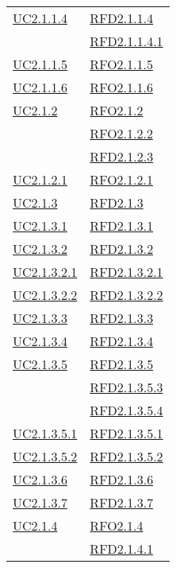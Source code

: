 \begin{longtable}{|>{\centering}m{5cm}|m{5cm}<{\centering}|}
\hyperref[UC2.1.1.4]{UC2.1.1.4} & \hyperlink{RFD2.1.1.4}{RFD2.1.1.4}\\
& \hyperlink{RFD2.1.1.4.1}{RFD2.1.1.4.1}\\ \hline
\hyperref[UC2.1.1.5]{UC2.1.1.5} & \hyperlink{RFO2.1.1.5}{RFO2.1.1.5}\\ \hline
\hyperref[UC2.1.1.6]{UC2.1.1.6} & \hyperlink{RFO2.1.1.6}{RFO2.1.1.6}\\ \hline
\hyperref[UC2.1.2]{UC2.1.2} & \hyperlink{RFO2.1.2}{RFO2.1.2}\\
& \hyperlink{RFO2.1.2.2}{RFO2.1.2.2}\\
& \hyperlink{RFD2.1.2.3}{RFD2.1.2.3}\\ \hline
\hyperref[UC2.1.2.1]{UC2.1.2.1} & \hyperlink{RFO2.1.2.1}{RFO2.1.2.1}\\ \hline
\hyperref[UC2.1.3]{UC2.1.3} & \hyperlink{RFD2.1.3}{RFD2.1.3}\\ \hline
\hyperref[UC2.1.3.1]{UC2.1.3.1} & \hyperlink{RFD2.1.3.1}{RFD2.1.3.1}\\ \hline
\hyperref[UC2.1.3.2]{UC2.1.3.2} & \hyperlink{RFD2.1.3.2}{RFD2.1.3.2}\\ \hline
\hyperref[UC2.1.3.2.1]{UC2.1.3.2.1} & \hyperlink{RFD2.1.3.2.1}{RFD2.1.3.2.1}\\ \hline
\hyperref[UC2.1.3.2.2]{UC2.1.3.2.2} & \hyperlink{RFD2.1.3.2.2}{RFD2.1.3.2.2}\\ \hline
\hyperref[UC2.1.3.3]{UC2.1.3.3} & \hyperlink{RFD2.1.3.3}{RFD2.1.3.3}\\ \hline
\hyperref[UC2.1.3.4]{UC2.1.3.4} & \hyperlink{RFD2.1.3.4}{RFD2.1.3.4}\\ \hline
\hyperref[UC2.1.3.5]{UC2.1.3.5} & \hyperlink{RFD2.1.3.5}{RFD2.1.3.5}\\
& \hyperlink{RFD2.1.3.5.3}{RFD2.1.3.5.3}\\
& \hyperlink{RFD2.1.3.5.4}{RFD2.1.3.5.4}\\ \hline
\hyperref[UC2.1.3.5.1]{UC2.1.3.5.1} & \hyperlink{RFD2.1.3.5.1}{RFD2.1.3.5.1}\\ \hline
\hyperref[UC2.1.3.5.2]{UC2.1.3.5.2} & \hyperlink{RFD2.1.3.5.2}{RFD2.1.3.5.2}\\ \hline
\hyperref[UC2.1.3.6]{UC2.1.3.6} & \hyperlink{RFD2.1.3.6}{RFD2.1.3.6}\\ \hline
\hyperref[UC2.1.3.7]{UC2.1.3.7} & \hyperlink{RFD2.1.3.7}{RFD2.1.3.7}\\ \hline
\hyperref[UC2.1.4]{UC2.1.4} & \hyperlink{RFO2.1.4}{RFO2.1.4}\\
& \hyperlink{RFD2.1.4.1}{RFD2.1.4.1}\\

\end{longtable}
